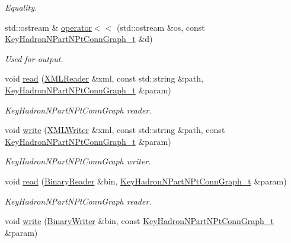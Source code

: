 \begin{DoxyCompactItemize}
\begin{DoxyCompactList}\small\item\em Equality. \end{DoxyCompactList}\item 
std\+::ostream \& \mbox{\hyperlink{namespaceHadron_a6447e57d6b19af925c635187757e2f02}{operator$<$$<$}} (std\+::ostream \&os, const \mbox{\hyperlink{structHadron_1_1KeyHadronNPartNPtConnGraph__t}{Key\+Hadron\+N\+Part\+N\+Pt\+Conn\+Graph\+\_\+t}} \&d)
\begin{DoxyCompactList}\small\item\em Used for output. \end{DoxyCompactList}\item 
void \mbox{\hyperlink{namespaceHadron_a3250f56af4c72ab50d162f878b999c09}{read}} (\mbox{\hyperlink{classADATXML_1_1XMLReader}{X\+M\+L\+Reader}} \&xml, const std\+::string \&path, \mbox{\hyperlink{structHadron_1_1KeyHadronNPartNPtConnGraph__t}{Key\+Hadron\+N\+Part\+N\+Pt\+Conn\+Graph\+\_\+t}} \&param)
\begin{DoxyCompactList}\small\item\em Key\+Hadron\+N\+Part\+N\+Pt\+Conn\+Graph reader. \end{DoxyCompactList}\item 
void \mbox{\hyperlink{namespaceHadron_a25da56def6a3cbbe579c9b7b4d27e848}{write}} (\mbox{\hyperlink{classADATXML_1_1XMLWriter}{X\+M\+L\+Writer}} \&xml, const std\+::string \&path, const \mbox{\hyperlink{structHadron_1_1KeyHadronNPartNPtConnGraph__t}{Key\+Hadron\+N\+Part\+N\+Pt\+Conn\+Graph\+\_\+t}} \&param)
\begin{DoxyCompactList}\small\item\em Key\+Hadron\+N\+Part\+N\+Pt\+Conn\+Graph writer. \end{DoxyCompactList}\item 
void \mbox{\hyperlink{namespaceHadron_a5b83c233560cd9c25b2793cb89778c6d}{read}} (\mbox{\hyperlink{classADATIO_1_1BinaryReader}{Binary\+Reader}} \&bin, \mbox{\hyperlink{structHadron_1_1KeyHadronNPartNPtConnGraph__t}{Key\+Hadron\+N\+Part\+N\+Pt\+Conn\+Graph\+\_\+t}} \&param)
\begin{DoxyCompactList}\small\item\em Key\+Hadron\+N\+Part\+N\+Pt\+Conn\+Graph reader. \end{DoxyCompactList}\item 
void \mbox{\hyperlink{namespaceHadron_a0a1d03111d7a7c9ff16ee1baf1928652}{write}} (\mbox{\hyperlink{classADATIO_1_1BinaryWriter}{Binary\+Writer}} \&bin, const \mbox{\hyperlink{structHadron_1_1KeyHadronNPartNPtConnGraph__t}{Key\+Hadron\+N\+Part\+N\+Pt\+Conn\+Graph\+\_\+t}} \&param)

\end{DoxyCompactItemize}
